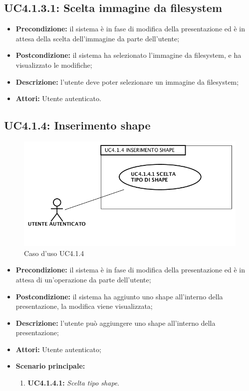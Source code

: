 \subsection{ UC4.1.3.1: Scelta immagine da filesystem}

\begin{itemize}
	\item \textbf{Precondizione:} il sistema è in fase di modifica della presentazione ed è in attesa della scelta dell'immagine da parte dell'utente;
	\item \textbf{Postcondizione:} il sistema ha selezionato l'immagine da filesystem, e ha visualizzato le modifiche;
	\item \textbf{Descrizione:} l'utente deve poter selezionare un immagine da filesystem;
	\item \textbf{Attori:} Utente autenticato.
\end{itemize}
\subsection{ UC4.1.4: Inserimento shape}

\begin{figure}[h]
	\begin{center}
	\includegraphics[scale=0.4]{diagram/UC4-1-4.png}
	\caption{Caso d'uso UC4.1.4}
	\end{center}
\end{figure}
\begin{itemize}
	\item \textbf{Precondizione:} il sistema è in fase di modifica della presentazione ed è in attesa di un'operazione da parte dell'utente;
	\item \textbf{Postcondizione:} il sistema ha aggiunto uno shape all'interno della presentazione, la modifica viene visualizzata;
	\item \textbf{Descrizione:} l'utente può aggiungere uno shape all'interno della presentazione;
	\item \textbf{Attori:} Utente autenticato;
	\item \textbf{Scenario principale:}
	\begin{enumerate}
		\item \textbf{ UC4.1.4.1:} \textit{ Scelta tipo shape}.
	\end{enumerate}
\end{itemize}
